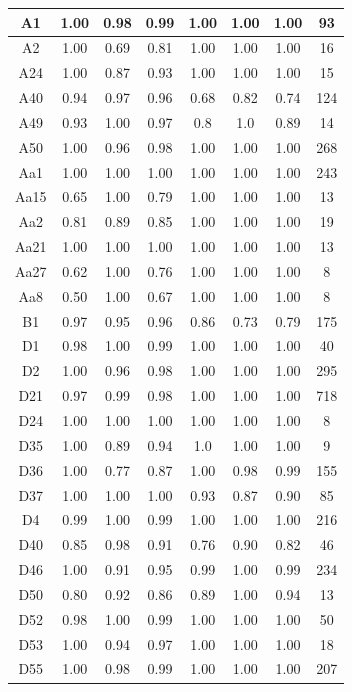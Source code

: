 \documentclass[10pt,onecolumn,letterpaper]{article}
\begin{document}
\begin{longtable}{|c|c|c|c|c|c|c|c|}
		A1 & 1.00 & 0.98 & 0.99 &1.00&1.00&1.00& 93 \\ \hline
		A2 & 1.00 & 0.69 & 0.81 &1.00&1.00&1.00& 16 \\ \hline
		A24 & 1.00 & 0.87 & 0.93 &1.00&1.00&1.00& 15 \\ \hline
		A40 & 0.94 & 0.97 & 0.96 &0.68&0.82&0.74& 124 \\ \hline
		A49 & 0.93 & 1.00 & 0.97 &0.8&1.0&0.89& 14 \\ \hline
		A50 & 1.00 & 0.96 & 0.98 &1.00&1.00&1.00& 268\\ \hline
		Aa1 & 1.00 & 1.00 & 1.00 &1.00&1.00&1.00& 243 \\ \hline
		Aa15 & 0.65 & 1.00 & 0.79    &1.00&1.00&1.00& 13 \\ \hline
		Aa2 & 0.81 & 0.89 & 0.85    &1.00&1.00&1.00& 19 \\ \hline
		Aa21 & 1.00 & 1.00 & 1.00    &1.00&1.00&1.00& 13 \\ \hline
		Aa27 & 0.62 & 1.00 & 0.76    &1.00&1.00&1.00&   8 \\ \hline
		Aa8 & 0.50 & 1.00 & 0.67    &1.00&1.00&1.00&   8 \\ \hline
		B1 & 0.97 & 0.95 & 0.96   &0.86&0.73&0.79& 175 \\ \hline
		D1 & 0.98 & 1.00 & 0.99   &1.00&1.00&1.00&   40 \\ \hline
		D2 & 1.00 & 0.96 & 0.98 &1.00&1.00&1.00& 295 \\ \hline
		D21 & 0.97 & 0.99 & 0.98 &1.00&1.00&1.00& 718 \\ \hline
		D24 & 1.00 & 1.00 & 1.00   &1.00&1.00&1.00&    8 \\ \hline
		D35 & 1.00 & 0.89 & 0.94   &1.0&1.00&1.00&    9 \\ \hline
		D36 & 1.00 & 0.77 & 0.87   &1.00&0.98&0.99& 155 \\ \hline
		D37 & 1.00 & 1.00 & 1.00   &0.93&0.87&0.90&   85 \\ \hline
		D4 & 0.99 & 1.00 & 0.99 &1.00&1.00&1.00& 216 \\ \hline
		D40 & 0.85 & 0.98 & 0.91  &0.76&0.90&0.82&    46 \\ \hline
		D46 & 1.00 & 0.91 & 0.95 &0.99&1.00&0.99& 234 \\ \hline
		D50 & 0.80 & 0.92 & 0.86    &0.89&1.00&0.94& 13 \\ \hline
		D52 & 0.98 & 1.00 & 0.99   &1.00&1.00&1.00&   50 \\ \hline
		D53 & 1.00 & 0.94 & 0.97    &1.00&1.00&1.00& 18 \\ \hline
		D55 & 1.00 & 0.98 & 0.99 &1.00&1.00&1.00& 207 \\ \hline

\end{longtable}
\end{document}

